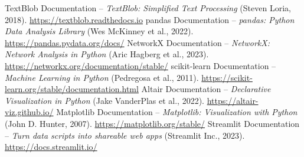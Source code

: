 \documentclass[12pt]{article}
\begin{document}
\begin{thebibliography}{9}
 TextBlob Documentation -- \textit{TextBlob: Simplified Text Processing} (Steven Loria, 2018). \url{https://textblob.readthedocs.io}
 pandas Documentation -- \textit{pandas: Python Data Analysis Library} (Wes McKinney et al., 2022). \url{https://pandas.pydata.org/docs/}
 NetworkX Documentation -- \textit{NetworkX: Network Analysis in Python} (Aric Hagberg et al., 2023). \url{https://networkx.org/documentation/stable/}
 scikit-learn Documentation -- \textit{Machine Learning in Python} (Pedregosa et al., 2011). \url{https://scikit-learn.org/stable/documentation.html}
 Altair Documentation -- \textit{Declarative Visualization in Python} (Jake VanderPlas et al., 2022). \url{https://altair-viz.github.io/}
 Matplotlib Documentation -- \textit{Matplotlib: Visualization with Python} (John D. Hunter, 2007). \url{https://matplotlib.org/stable/}
 Streamlit Documentation -- \textit{Turn data scripts into shareable web apps} (Streamlit Inc., 2023). \url{https://docs.streamlit.io/}
\end{thebibliography}
\end{document}
